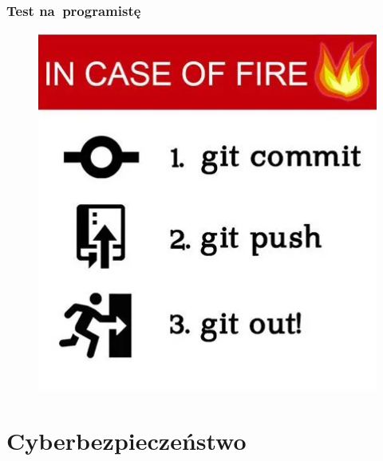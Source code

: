 \documentclass[10pt,t]{beamer}
\begin{document}
\begin{frame}
  \frametitle{Test na~programistę}


  \begin{figure}

    \centering


    \includegraphics[scale=0.45]
    {./PresentationsPictures/In-the-case-of-fire.png}

  \end{figure}

\end{frame}










\section{Cyberbezpieczeństwo}
\end{document}

